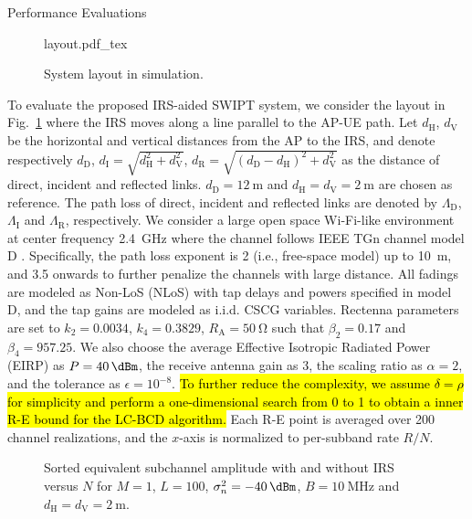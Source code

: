 \documentclass[journal,12pt,onecolumn,draftclsnofoot]{IEEEtran}
\begin{document}
	\begin{section}{Performance Evaluations}\label{se:performance_evaluation}
		\begin{figure}[!t]
			\centering
			\def\svgwidth{0.5\columnwidth}
			{layout.pdf_tex}
			\caption{System layout in simulation.}
			\label{fi:layout}
		\end{figure}

		To evaluate the proposed IRS-aided SWIPT system, we consider the layout in Fig.~\ref{fi:layout} where the IRS moves along a line parallel to the AP-UE path. Let $d_{\mathrm{H}}$, $d_{\mathrm{V}}$ be the horizontal and vertical distances from the AP to the IRS, and denote respectively $d_{\mathrm{D}}$, $d_{\mathrm{I}}=\sqrt{d_{\mathrm{H}}^2+d_{\mathrm{V}}^2}$, $d_{\mathrm{R}}=\sqrt{(d_{\mathrm{D}}-d_{\mathrm{H}})^2+d_{\mathrm{V}}^2}$ as the distance of direct, incident and reflected links. $d_{\mathrm{D}}=\SI{12}{\meter}$ and $d_{\mathrm{H}}=d_{\mathrm{V}}=\SI{2}{\meter}$ are chosen as reference. The path loss of direct, incident and reflected links are denoted by $\Lambda_{\mathrm{D}}$, $\Lambda_{\mathrm{I}}$ and $\Lambda_{\mathrm{R}}$, respectively. We consider a large open space Wi-Fi-like environment at center frequency \SI{2.4}{\GHz} where the channel follows IEEE TGn channel model D \cite{Erceg2004}. Specifically, the path loss exponent is \num{2} (i.e., free-space model) up to \SI{10}{\meter}, and \num{3.5} onwards to further penalize the channels with large distance. All fadings are modeled as Non-LoS (NLoS) with tap delays and powers specified in model D, and the tap gains are modeled as i.i.d. CSCG variables. Rectenna parameters are set to $k_2=0.0034$, $k_4=0.3829$, $R_{\mathrm{A}}=\SI{50}{\ohm}$ \cite{Clerckx2016a} such that $\beta_2=0.17$ and $\beta_4=957.25$. We also choose the average Effective Isotropic Radiated Power (EIRP) as $P=\SI{40}{\dBm}$, the receive antenna gain as \SI{3}{\dBi}, the scaling ratio as $\alpha=2$, and the tolerance as $\epsilon=10^{-8}$. \hl{To further reduce the complexity, we assume $\delta=\rho$ for simplicity and perform a one-dimensional search from \num{0} to \num{1} to obtain a inner R-E bound for the LC-BCD algorithm.} Each R-E point is averaged over \num{200} channel realizations, and the $x$-axis is normalized to per-subband rate $R/N$.

		\begin{figure}[!t]
			\centering
			\resizebox{0.5\columnwidth}{!}{
				
			}
			\caption{Sorted equivalent subchannel amplitude with and without IRS versus $N$ for $M=1$, $L=100$, $\sigma_n^2=\SI{-40}{\dBm}$, $B=\SI{10}{\MHz}$ and $d_{\mathrm{H}}=d_{\mathrm{V}}=\SI{2}{\meter}$.}
			\label{fi:channel_amplitude}
		\end{figure}


\end{section}
\end{document}
